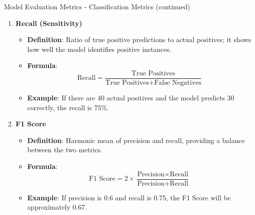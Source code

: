 \documentclass[aspectratio=169]{beamer}
\begin{document}
\begin{frame}[fragile]{Model Evaluation Metrics - Classification Metrics (continued)}
    \begin{enumerate}[resume]
        \item \textbf{Recall (Sensitivity)}
        \begin{itemize}
            \item \textbf{Definition}: Ratio of true positive predictions to actual positives; it shows how well the model identifies positive instances.
            \item \textbf{Formula}: 
            \begin{equation}
            \text{Recall} = \frac{\text{True Positives}}{\text{True Positives} + \text{False Negatives}}
            \end{equation}
            \item \textbf{Example}: If there are 40 actual positives and the model predicts 30 correctly, the recall is 75\%.
        \end{itemize}
        
        \item \textbf{F1 Score}
        \begin{itemize}
            \item \textbf{Definition}: Harmonic mean of precision and recall, providing a balance between the two metrics.
            \item \textbf{Formula}: 
            \begin{equation}
            \text{F1 Score} = 2 \times \frac{\text{Precision} \times \text{Recall}}{\text{Precision} + \text{Recall}}
            \end{equation}
            \item \textbf{Example}: If precision is 0.6 and recall is 0.75, the F1 Score will be approximately 0.67.
        \end{itemize}
    \end{enumerate}
\end{frame}
\end{document}
